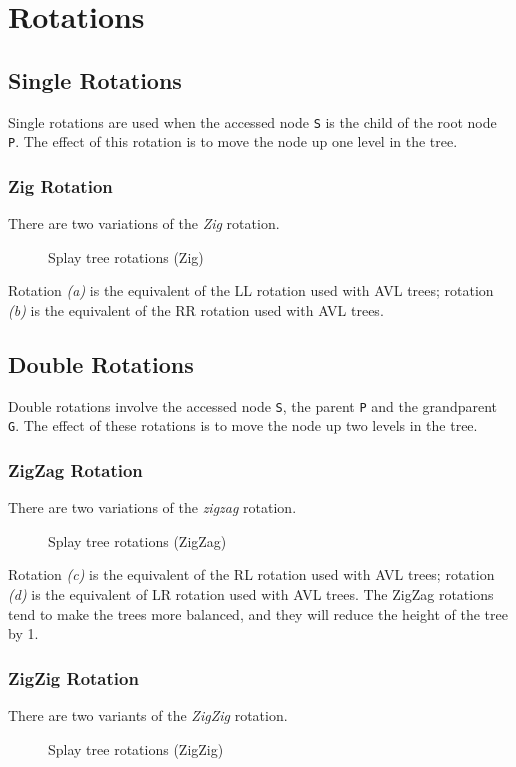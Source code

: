 \section{Rotations}

\subsection{Single Rotations}
Single rotations are used when the accessed node \verb|S| is the child of the root node \verb|P|. The effect of this rotation is to move the node up one level in the tree.

\subsubsection{Zig Rotation}
There are two variations of the \textit{Zig} rotation.
\begin{figure}[H]
    \centering
    
    \caption{Splay tree rotations (Zig)}
\end{figure}

Rotation \textit{(a)} is the equivalent of the LL rotation used with AVL trees; rotation \textit{(b)} is the equivalent of the RR rotation used with AVL trees.

\subsection{Double Rotations}
Double rotations involve the accessed node \verb|S|, the parent \verb|P| and the grandparent \verb|G|. The effect of these rotations is to move the node up two levels in the tree.

\subsubsection{ZigZag Rotation}
There are two variations of the \textit{zigzag} rotation. 
\begin{figure}[H]
    \centering
    
    \caption{Splay tree rotations (ZigZag)}    
\end{figure}

Rotation \textit{(c)} is the equivalent of the RL rotation used with AVL trees; rotation \textit{(d)} is the equivalent of LR rotation used with AVL trees. The ZigZag rotations tend to make the trees more balanced, and they will reduce the height of the tree by 1. 

\subsubsection{ZigZig Rotation}
There are two variants of the \textit{ZigZig} rotation.
\begin{figure}[H]
    \centering
    
    \caption{Splay tree rotations (ZigZig)}
\end{figure}

